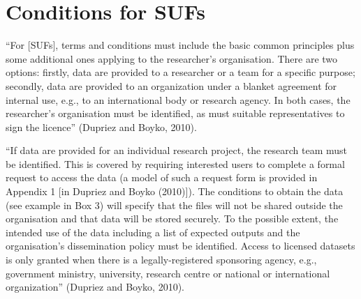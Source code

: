 \documentclass[letterpaper,10pt,english]{sphinxmanual}
\begin{document}
\section{Conditions for SUFs}
\label{\detokenize{release_types:conditions-for-sufs}}
“For {[}SUFs{]}, terms and conditions must include the basic common
principles plus some additional ones applying to the researcher’s
organisation. There are two options: firstly, data are provided to a
researcher or a team for a specific purpose; secondly, data are provided
to an organization under a blanket agreement for internal use, e.g., to
an international body or research agency. In both cases, the
researcher’s organisation must be identified, as must suitable
representatives to sign the licence” (Dupriez and Boyko, 2010).


“If data are provided for an individual research project, the research
team must be identified. This is covered by requiring interested users
to complete a formal request to access the data (a model of such a
request form is provided in Appendix 1 {[}in Dupriez and Boyko (2010){]}).
The conditions to obtain the data (see example in Box 3) will specify
that the files will not be shared outside the organisation and that data
will be stored securely. To the possible extent, the intended use of the
data \textendash{} including a list of expected outputs and the organisation’s
dissemination policy \textendash{} must be identified. Access to licensed datasets
is only granted when there is a legally-registered sponsoring agency,
e.g., government ministry, university, research centre or national or
international organization” (Dupriez and Boyko, 2010).
\end{document}
